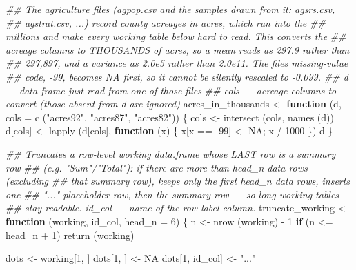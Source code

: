 \documentclass[
  letterpaper,
  DIV=11,
  numbers=noendperiod]{scrreprt}
\newenvironment{Shaded}{\begin{snugshade}}{\end{snugshade}}
\newcommand{\AttributeTok}[1]{\textcolor[rgb]{0.40,0.45,0.13}{#1}}
\newcommand{\ConstantTok}[1]{\textcolor[rgb]{0.56,0.35,0.01}{#1}}
\newcommand{\ControlFlowTok}[1]{\textcolor[rgb]{0.00,0.23,0.31}{\textbf{#1}}}
\newcommand{\DecValTok}[1]{\textcolor[rgb]{0.68,0.00,0.00}{#1}}
\newcommand{\DocumentationTok}[1]{\textcolor[rgb]{0.37,0.37,0.37}{\textit{#1}}}
\newcommand{\FunctionTok}[1]{\textcolor[rgb]{0.28,0.35,0.67}{#1}}
\newcommand{\NormalTok}[1]{\textcolor[rgb]{0.00,0.23,0.31}{#1}}
\newcommand{\OtherTok}[1]{\textcolor[rgb]{0.00,0.23,0.31}{#1}}
\newcommand{\SpecialCharTok}[1]{\textcolor[rgb]{0.37,0.37,0.37}{#1}}
\newcommand{\StringTok}[1]{\textcolor[rgb]{0.13,0.47,0.30}{#1}}
\renewcommand{\[}{\begin{equation}}
\renewcommand{\]}{\end{equation}}
\begin{document}
\begin{Shaded}
\begin{Highlighting}[]
\DocumentationTok{\#\# The agriculture files (agpop.csv and the samples drawn from it: agsrs.csv,}
\DocumentationTok{\#\# agstrat.csv, ...) record county acreages in acres, which run into the}
\DocumentationTok{\#\# millions and make every working table below hard to read. This converts the}
\DocumentationTok{\#\# acreage columns to THOUSANDS of acres, so a mean reads as 297.9 rather than}
\DocumentationTok{\#\# 297,897, and a variance as 2.0e5 rather than 2.0e11. The file\textquotesingle{}s missing{-}value}
\DocumentationTok{\#\# code, {-}99, becomes NA first, so it cannot be silently rescaled to {-}0.099.}
\DocumentationTok{\#\# d {-}{-}{-} data frame just read from one of those files}
\DocumentationTok{\#\# cols {-}{-}{-} acreage columns to convert (those absent from d are ignored)}
\NormalTok{acres\_in\_thousands }\OtherTok{\textless{}{-}} \ControlFlowTok{function}\NormalTok{ (d, }\AttributeTok{cols =} \FunctionTok{c}\NormalTok{ (}\StringTok{"acres92"}\NormalTok{, }\StringTok{"acres87"}\NormalTok{, }\StringTok{"acres82"}\NormalTok{))}
\NormalTok{\{}
\NormalTok{    cols }\OtherTok{\textless{}{-}} \FunctionTok{intersect}\NormalTok{ (cols, }\FunctionTok{names}\NormalTok{ (d))}
\NormalTok{    d[cols] }\OtherTok{\textless{}{-}} \FunctionTok{lapply}\NormalTok{ (d[cols], }\ControlFlowTok{function}\NormalTok{ (x) \{ x[x }\SpecialCharTok{==} \SpecialCharTok{{-}}\DecValTok{99}\NormalTok{] }\OtherTok{\textless{}{-}} \ConstantTok{NA}\NormalTok{; x }\SpecialCharTok{/} \DecValTok{1000}\NormalTok{ \})}
\NormalTok{    d}
\NormalTok{\}}

\DocumentationTok{\#\# Truncates a row{-}level working data.frame whose LAST row is a summary row}
\DocumentationTok{\#\# (e.g. "Sum"/"Total"): if there are more than head\_n data rows (excluding}
\DocumentationTok{\#\# that summary row), keeps only the first head\_n data rows, inserts one}
\DocumentationTok{\#\# "..." placeholder row, then the summary row {-}{-}{-} so long working tables}
\DocumentationTok{\#\# stay readable. id\_col {-}{-}{-} name of the row{-}label column.}
\NormalTok{truncate\_working }\OtherTok{\textless{}{-}} \ControlFlowTok{function}\NormalTok{ (working, id\_col, }\AttributeTok{head\_n =} \DecValTok{6}\NormalTok{)}
\NormalTok{\{}
\NormalTok{    n }\OtherTok{\textless{}{-}} \FunctionTok{nrow}\NormalTok{ (working) }\SpecialCharTok{{-}} \DecValTok{1}
    \ControlFlowTok{if}\NormalTok{ (n }\SpecialCharTok{\textless{}=}\NormalTok{ head\_n }\SpecialCharTok{+} \DecValTok{1}\NormalTok{) }\FunctionTok{return}\NormalTok{ (working)}

\NormalTok{    dots }\OtherTok{\textless{}{-}}\NormalTok{ working[}\DecValTok{1}\NormalTok{, ]}
\NormalTok{    dots[}\DecValTok{1}\NormalTok{, ] }\OtherTok{\textless{}{-}} \ConstantTok{NA}
\NormalTok{    dots[}\DecValTok{1}\NormalTok{, id\_col] }\OtherTok{\textless{}{-}} \StringTok{"..."}


\end{Highlighting}
\end{Shaded}
\end{document}
